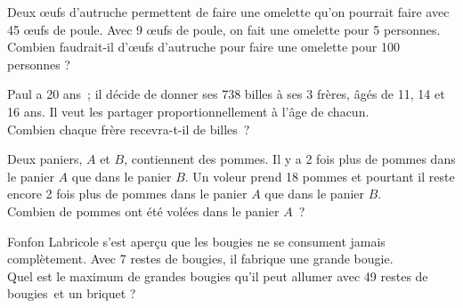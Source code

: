 \begin{enigme}

Deux œufs d’autruche permettent de faire une omelette qu’on pourrait faire avec 45 œufs de poule. Avec 9 œufs de poule, on fait une omelette pour 5 personnes. \\[0.5em]
Combien faudrait-il d’œufs d’autruche pour faire une omelette pour 100 personnes ?

\end{enigme} 


\begin{enigme}

Paul a 20 ans ; il décide de donner ses 738 billes à ses 3 frères, âgés de 11, 14 et 16 ans. Il veut les partager proportionnellement à l’âge de chacun. \\[0.5em]
Combien chaque frère recevra-t-il de billes ?
           
\end{enigme} 


\begin{enigme}

Deux paniers, $A$ et $B$, contiennent des pommes. Il y a 2 fois plus de pommes dans le panier $A$ que dans le panier $B$. Un voleur prend 18 pommes et pourtant il reste encore 2 fois plus de pommes dans le panier $A$ que dans le panier $B$. \\[0.5em]
Combien de pommes ont été volées dans le panier $A$ ?

\end{enigme} 


\begin{enigme}

Fonfon Labricole s’est aperçu que les bougies ne se consument jamais complètement. Avec 7 restes de bougies, il fabrique une grande bougie. \\[0.5em]
Quel est le maximum de grandes bougies qu’il peut allumer avec 49 restes de bougies et un briquet ?

\end{enigme} 

